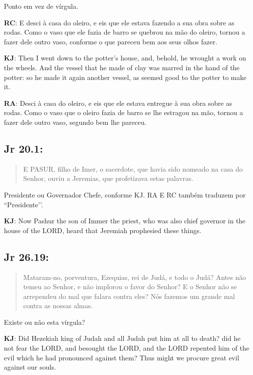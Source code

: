 Ponto em vez de vírgula.

\textbf{RC}: E desci à casa do oleiro, e eis que ele estava fazendo a sua obra sobre as rodas. Como o vaso que ele fazia de barro se quebrou na mão do oleiro, tornou a fazer dele outro vaso, conforme o que pareceu bem aos seus olhos fazer.

\textbf{KJ}: Then I went down to the potter’s house, and, behold, he wrought a work on the wheels. And the vessel that he made of clay was marred in the hand of the potter: so he made it again another vessel, as seemed good to the potter to make it.

\textbf{RA}: Desci à casa do oleiro, e eis que ele estava entregue à sua obra sobre as rodas. Como o vaso que o oleiro fazia de barro se lhe estragou na mão, tornou a fazer dele outro vaso, segundo bem lhe pareceu.

\subsection*{Jr 20.1:} 
 \begin{quote}
  \small
 E PASUR, filho de Imer, o sacerdote, que havia sido nomeado  na casa do Senhor, ouviu a Jeremias, que profetizava estas palavras.
 \end{quote}

Presidente ou Governador Chefe, conforme KJ. RA E RC também traduzem por ``Presidente’’.

\textbf{KJ}: Now Pashur the son of Immer the priest, who was also chief governor in the house of the LORD, heard that Jeremiah prophesied these things.

\subsection*{Jr 26.19:} 
 \begin{quote}
  \small
 Mataram-no, porventura, Ezequias, rei de Judá, e todo o Judá? Antes não temeu ao Senhor, e não implorou o favor do Senhor? E o Senhor não se arrependeu do mal que falara contra eles? Nós\uwave{,} fazemos um grande mal contra as nossas almas.
 \end{quote}

Existe ou não esta vírgula?

\textbf{KJ}: Did Hezekiah king of Judah and all Judah put him at all to death? did he not fear the LORD, and besought the LORD, and the LORD repented him of the evil which he had pronounced against them? Thus might we procure great evil against our souls.

